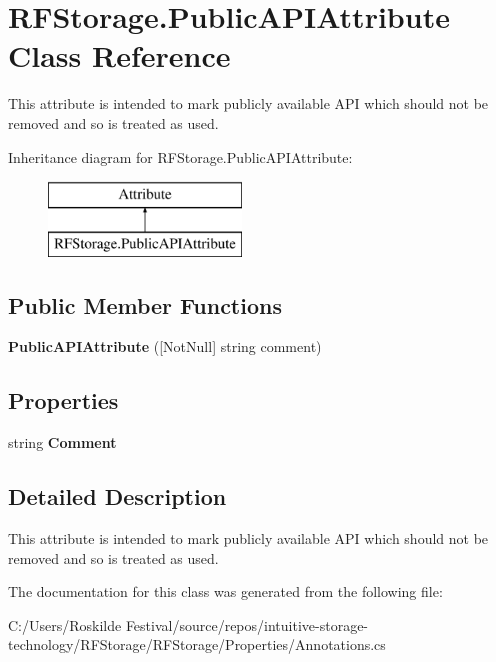 \section{R\+F\+Storage.\+Public\+A\+P\+I\+Attribute Class Reference}
\label{class_r_f_storage_1_1_public_a_p_i_attribute}


This attribute is intended to mark publicly available A\+PI which should not be removed and so is treated as used.  


Inheritance diagram for R\+F\+Storage.\+Public\+A\+P\+I\+Attribute\+:\begin{figure}[H]
\begin{center}
\leavevmode
\includegraphics[height=2.000000cm]{class_r_f_storage_1_1_public_a_p_i_attribute}
\end{center}
\end{figure}
\subsection*{Public Member Functions}
\begin{DoxyCompactItemize}
\item 
\mbox{\label{class_r_f_storage_1_1_public_a_p_i_attribute_a1ed80a17937c5cb90b1aa2d6598bf0ec}} 
{\bfseries Public\+A\+P\+I\+Attribute} ([Not\+Null] string comment)
\end{DoxyCompactItemize}
\subsection*{Properties}
\begin{DoxyCompactItemize}
\item 
\mbox{\label{class_r_f_storage_1_1_public_a_p_i_attribute_a5f2fad27fedc9133864d138f3734ee97}} 
string {\bfseries Comment}\hspace{0.3cm}{\ttfamily  [get]}
\end{DoxyCompactItemize}


\subsection{Detailed Description}
This attribute is intended to mark publicly available A\+PI which should not be removed and so is treated as used. 



The documentation for this class was generated from the following file\+:\begin{DoxyCompactItemize}
\item 
C\+:/\+Users/\+Roskilde Festival/source/repos/intuitive-\/storage-\/technology/\+R\+F\+Storage/\+R\+F\+Storage/\+Properties/Annotations.\+cs\end{DoxyCompactItemize}
